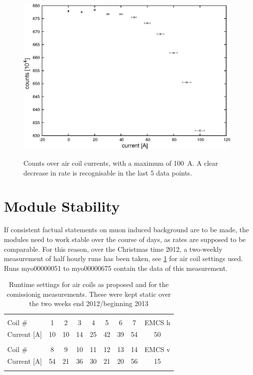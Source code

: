   \begin{figure}

  \centering
  	\includegraphics[width = 0.9 \textwidth]{graphics/aircoilCounts/aircoilsCountsCurrent.eps}
  	  \label{fig:aircoilCountsCurrent}
  	\caption{Counts over air coil currents, with a maximum of \SI{100}{\ampere}. A clear decrease in rate is recognisable in the last 5 data points.}
  \end{figure}
  

  \section{Module Stability}
  \label{ch:Analysis:sec:Module Stability}
  If consistent factual statements on muon induced background are to be made, the modules need to work stable over the course of days, as rates are supposed to be comparable. For this reason, over the Christmas time 2012, a two-weekly measurement of half hourly runs has been taken, see \ref{tab:airCoilSettingsChristmas} for air coil settings used. Runs myo00000051 to myo00000675 contain the data of this measurement.
  \begin{table}
  \centering
   \begin{tabular}{|l|ccccccc|c|}
    \hline
    &&&&&&&&\\
    Coil \#	&1	&2	&3	&4	&5	&6	&7	&EMCS h	\\
    Current [A]	&10	&10	&14	&25	&42	&39	&54	&50  	\\
    &&&&&&&&\\
    Coil \# 	&8	&9	&10	&11	&12	&13	&14	&EMCS v	\\
    Current [A]	&54	&21	&36	&30	&21	&20	&56	&15    	\\
    &&&&&&&&\\
    \hline
   \end{tabular}
  \caption{Runtime settings for air coils as proposed and for the comissionig measurements. These were kept static over the two weeks end 2012/beginning 2013}
  \label{tab:airCoilSettingsChristmas}
  \end{table}

